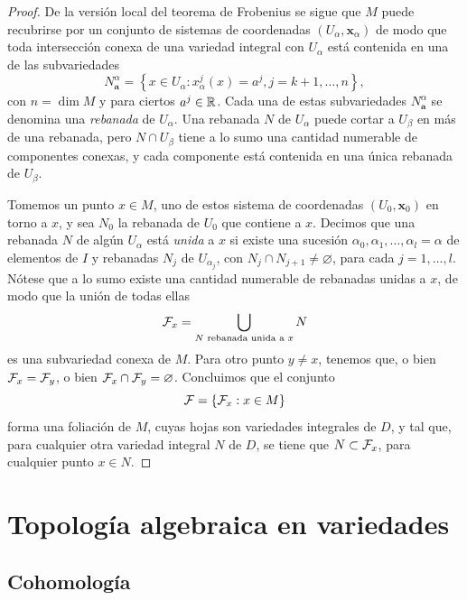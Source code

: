 \documentclass[11pt,a4paper]{amsbook}
\theoremstyle{remark} \newtheorem{rmk}[subsection]{Observación}
\theoremstyle{definition} \newtheorem{defn}[subsection]{Definición}
\theoremstyle{definition} \newtheorem{ex}[subsection]{Ejemplo}
\theoremstyle{definition} \newtheorem{ej}[subsection]{Ejercicio}
\begin{document}
\begin{proof}
De la versión local del teorema de Frobenius se sigue que $M$ puede recubrirse por un conjunto de sistemas de coordenadas $(U_\alpha,\bm{x}_\alpha)$ de modo que toda intersección conexa de una variedad integral con $U_\alpha$ está contenida en una de las subvariedades
  \begin{equation*}
N^\alpha_{\bm{a}}=\left\{ x \in U_\alpha: x^j_\alpha(x)=a^j, j=k+1,\dots,n \right\},
  \end{equation*}
  con $n=\dim M$ y para ciertos $a^j\in \mathbb R$. Cada una de estas subvariedades $N^\alpha_{\bm{a}}$ se denomina una \emph{rebanada} de $U_\alpha$. Una rebanada $N$ de $U_\alpha$ puede cortar a $U_\beta$ en más de una rebanada, pero $N\cap U_\beta$ tiene a lo sumo una cantidad numerable de componentes conexas, y cada componente está contenida en una única rebanada de $U_\beta$.

  Tomemos un punto $x\in M$, uno de estos sistema de coordenadas $(U_0,\bm{x}_0)$ en torno a $x$, y sea $N_0$ la rebanada de $U_0$ que contiene a $x$. Decimos que una rebanada $N$ de algún $U_\alpha$ está \emph{unida} a $x$ si existe una sucesión $\alpha_0,\alpha_1,\dots,\alpha_l=\alpha$ de elementos de $I$ y rebanadas $N_{j}$ de $U_{\alpha_j}$,  con $N_j\cap N_{j+1}\neq \varnothing$, para cada $j=1,\dots,l$.
  Nótese que a lo sumo existe una cantidad numerable de rebanadas unidas a $x$, de modo que la unión de todas ellas
  \begin{equation*}
\mathcal F_x = \bigcup_{N \text{ rebanada unida a }x} N
  \end{equation*}
  es una subvariedad conexa de $M$. Para otro punto $y\neq x$, tenemos que, o bien $\mathcal F_x=\mathcal F_y$, o bien $\mathcal F_x\cap \mathcal F_y = \varnothing$. Concluimos que el conjunto
  \begin{equation*}
\mathcal F=\left\{ \mathcal F_x : x\in M \right\}
  \end{equation*}
forma una foliación de $M$, cuyas hojas son variedades integrales de $D$, y tal que, para cualquier otra variedad integral $N$ de $D$, se tiene que $N\subset \mathcal F_x$, para cualquier punto $x\in N$.
\end{proof}


\chapter{Topología algebraica en variedades}

\section{Cohomología}
\end{document}

